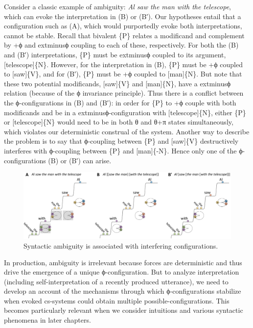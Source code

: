   Consider a classic example of ambiguity: \textit{Al saw the man with the telescope}, which can evoke the interpretation in {}(B) or (B′). Our  hypotheses entail that a configuration such as (A), which would purportedly evoke both interpretations, cannot be stable. Recall that bivalent \{P\} relates a modificand and complement by +ϕ and 	extminus{}ϕ coupling to each of these, respectively. For both the (B) and (B′) interpretations, \{P\} must be 	extminus{}ϕ coupled to its argument, [telescope]\{N\}. However, for the interpretation in (B), \{P\} must be +ϕ coupled to [saw]\{V\}, and for (B′), \{P\} must be +ϕ coupled to [man]\{N\}. But note that these two potential modificands, [saw]\{V\} and [man]\{N\}, have a 	extminus{}ϕ relation (because of the ϕ invariance principle). Thus there is a conflict between the ϕ-con\-fig\-u\-ra\-tions in (B) and (B′): in order for \{P\} to +ϕ couple with both modificands and be in a 	extminus{}ϕ-con\-fig\-u\-ra\-tion with [telescope]\{N\}, either \{P\} or [telescope]\{N\} would need to be in both θ and θ+π states simultaneously, which violates our deterministic construal of the system. Another way to describe the problem is to say that ϕ-coupling between \{P\} and [saw]\{V\} destructively interferes with ϕ-coupling between \{P\} and [man]\{-N\}. Hence only one of the ϕ-con\-fig\-u\-ra\-tions (B) or (B′) can arise.

  
\begin{figure}
\includegraphics[width=\textwidth]{figures/Tilsen-img89.png}
\caption{Syntactic ambiguity is associated with interfering configurations.}
\label{fig:4:39}
\end{figure}
 

  In production, ambiguity is irrelevant because  forces are deterministic and thus drive the emergence of a unique ϕ-con\-fig\-u\-ra\-tion. But to analyze interpretation (including self-interpretation of a recently produced utterance), we need to develop an account of the mechanisms through which ϕ-con\-fig\-u\-ra\-tions stabilize when evoked cs-systems could obtain multiple possible-con\-fig\-u\-ra\-tions. This becomes particularly relevant when we consider  intuitions and various syntactic phenomena in later chapters.

